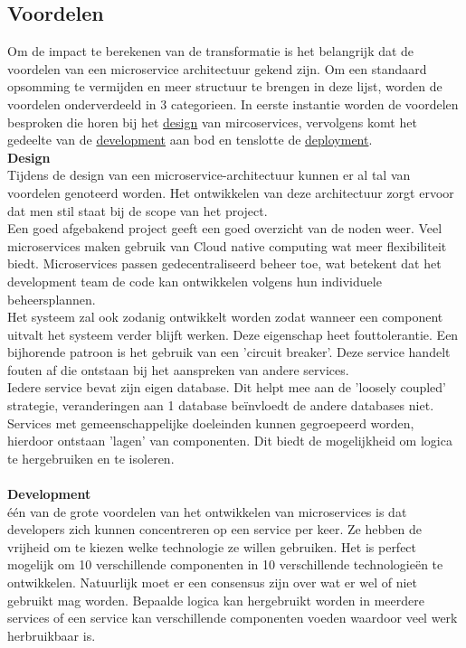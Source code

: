\subsection{Voordelen}
Om de impact te berekenen van de transformatie is het belangrijk dat de voordelen van een microservice architectuur gekend zijn. Om een standaard opsomming te vermijden en meer structuur te brengen in deze lijst, worden de voordelen onderverdeeld in 3 categorieen. In eerste instantie worden de voordelen besproken die horen bij het \underline{design} van mircoservices, vervolgens komt het gedeelte van de \underline{development} aan bod en tenslotte de \underline{deployment}.\\

\textbf{Design}\\ 
Tijdens de design van een microservice-architectuur kunnen er al tal van voordelen genoteerd worden. Het ontwikkelen van deze architectuur zorgt ervoor dat men stil staat bij de scope van het project.\\ 
Een goed afgebakend project geeft een goed overzicht van de noden weer. Veel microservices maken gebruik van Cloud native computing wat meer flexibiliteit biedt. Microservices passen gedecentraliseerd beheer toe, wat betekent dat het development team de code kan ontwikkelen volgens hun individuele beheersplannen.\\ 
Het systeem zal ook zodanig ontwikkelt worden zodat wanneer een component uitvalt het systeem verder blijft werken. Deze eigenschap heet fouttolerantie. Een bijhorende patroon is het gebruik van een 'circuit breaker'. Deze service handelt fouten af die ontstaan bij het aanspreken van andere services.\\
Iedere service bevat zijn eigen database. Dit helpt mee aan de 'loosely coupled' strategie, veranderingen aan 1 database beïnvloedt de andere databases niet.\\
Services met gemeenschappelijke doeleinden kunnen gegroepeerd worden, hierdoor ontstaan 'lagen' van
componenten. Dit biedt de mogelijkheid om logica te hergebruiken en te isoleren.\\ \\
\textbf{Development}\\ één van de grote voordelen van het ontwikkelen van microservices is dat developers zich kunnen concentreren op een service per keer. Ze hebben de vrijheid om te kiezen welke technologie ze willen gebruiken. Het is perfect mogelijk om 10 verschillende componenten in 10 verschillende technologieën te ontwikkelen. Natuurlijk moet er een consensus zijn over wat er wel of niet gebruikt mag worden. Bepaalde logica kan hergebruikt worden in meerdere services of een service kan verschillende componenten voeden waardoor veel werk herbruikbaar is. \\
